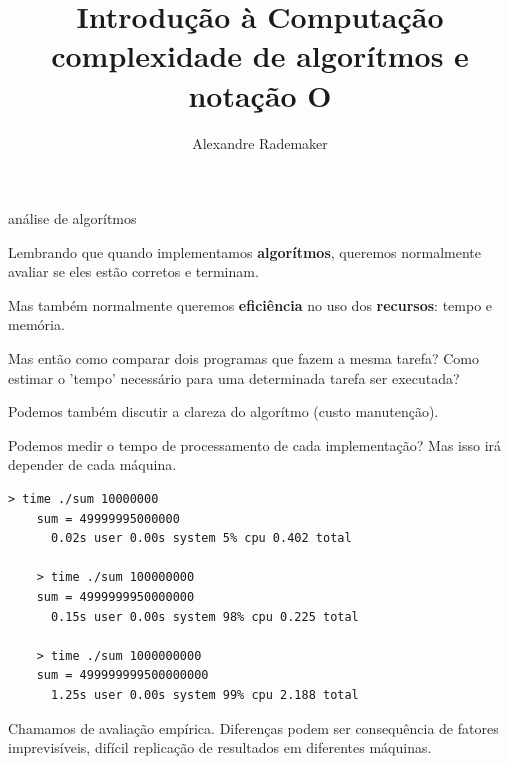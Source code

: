 \documentclass{beamer}
\title{Introdução à Computação \\ complexidade de algorítmos e notação O}
\author{Alexandre Rademaker}
\date{}
\begin{document}
\begin{frame}
 \maketitle
\end{frame}


\begin{frame}{análise de algorítmos}

  Lembrando que quando implementamos \textbf{algorítmos}, queremos
  normalmente avaliar se eles estão corretos e terminam.
 
  Mas também normalmente queremos \textbf{eficiência} no uso dos
  \textbf{recursos}: tempo e memória.
 
  Mas então como comparar dois programas que fazem a mesma tarefa?
  Como estimar o 'tempo' necessário para uma determinada tarefa ser
  executada?

  Podemos também discutir a clareza do algorítmo (custo manutenção).
  
  \framebreak

  Podemos medir o tempo de processamento de cada implementação? Mas
  isso irá depender de cada máquina.

  

  \framebreak

  \begin{lstlisting}[style=code]
    > time ./sum 10000000
    sum = 49999995000000
      0.02s user 0.00s system 5% cpu 0.402 total

    > time ./sum 100000000
    sum = 4999999950000000
      0.15s user 0.00s system 98% cpu 0.225 total

    > time ./sum 1000000000
    sum = 499999999500000000
      1.25s user 0.00s system 99% cpu 2.188 total
  \end{lstlisting}

  Chamamos de avaliação empírica. Diferenças podem ser consequência de
  fatores imprevisíveis, difícil replicação de resultados em
  diferentes máquinas.
  
\end{frame}
\end{document}
